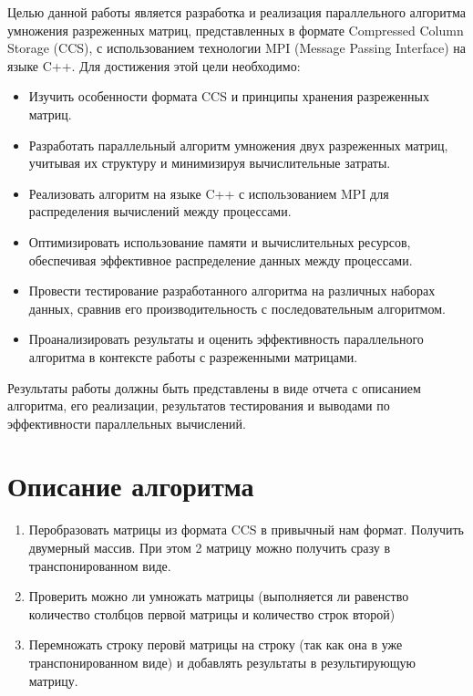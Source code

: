 \documentclass[a4paper,12pt]{article}
\begin{document}
Целью данной работы является разработка и реализация параллельного алгоритма умножения разреженных матриц, представленных в формате Compressed Column Storage (CCS), с использованием технологии MPI (Message Passing Interface) на языке C++. Для достижения этой цели необходимо:
\begin{itemize}
\item Изучить особенности формата CCS и принципы хранения разреженных матриц.

\item Разработать параллельный алгоритм умножения двух разреженных матриц, учитывая их структуру и минимизируя вычислительные затраты.

\item Реализовать алгоритм на языке C++ с использованием MPI для распределения вычислений между процессами.

\item Оптимизировать использование памяти и вычислительных ресурсов, обеспечивая эффективное распределение данных между процессами.

\item Провести тестирование разработанного алгоритма на различных наборах данных, сравнив его производительность с последовательным алгоритмом.

\item Проанализировать результаты и оценить эффективность параллельного алгоритма в контексте работы с разреженными матрицами.
\end{itemize}
Результаты работы должны быть представлены в виде отчета с описанием алгоритма, его реализации, результатов тестирования и выводами по эффективности параллельных вычислений.

\section{Описание алгоритма}

\begin{enumerate}
  \item Перобразовать матрицы из формата CCS в привычный нам формат. Получить двумерный массив. При этом 2 матрицу можно получить сразу в транспонированном виде. 
  \item Проверить можно ли умножать матрицы (выполняется ли равенство количество столбцов первой матрицы и количество строк второй)
  \item Перемножать строку перовй матрицы на строку (так как она в уже транспонированном виде) и добавлять результаты в результирующую матрицу.
\end{enumerate}
\end{document}

